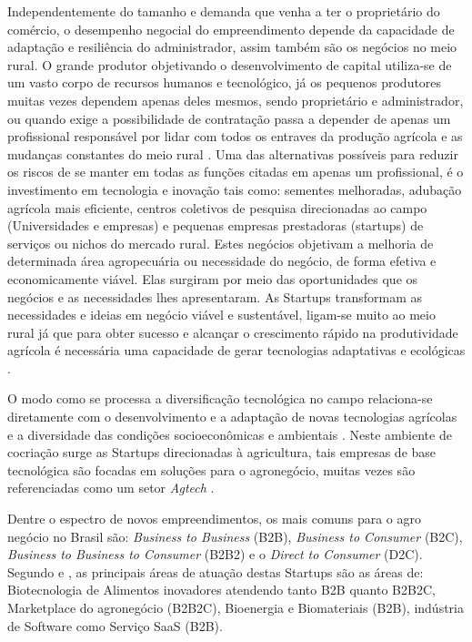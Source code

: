 Independentemente do tamanho e demanda que venha a ter o proprietário do comércio, o desempenho negocial do empreendimento depende da capacidade de adaptação e resiliência  do administrador, assim também são os negócios no meio rural. O grande produtor objetivando o desenvolvimento de capital utiliza-se de um vasto corpo de recursos humanos e tecnológico, já os pequenos produtores muitas vezes dependem apenas deles mesmos, sendo proprietário e administrador, ou quando exige a possibilidade de contratação passa a depender de apenas um profissional responsável por lidar com todos os entraves da produção agrícola e as mudanças constantes do meio rural \cite{soares_relacao_2017}. Uma das alternativas possíveis para reduzir os riscos de se manter em todas as funções citadas em apenas um profissional, é o investimento em tecnologia e inovação tais como: sementes melhoradas, adubação agrícola mais eficiente, centros coletivos de pesquisa direcionadas ao campo (Universidades e empresas) \cite{bochi_dorneles_coletivos_2014, gomes_inovacao_2014} e pequenas empresas prestadoras (startups) de serviços ou nichos do mercado rural. Estes negócios objetivam a melhoria de determinada área agropecuária \cite{junior_agtechs:_2019} ou necessidade do negócio, de forma efetiva e economicamente viável. Elas surgiram por meio das oportunidades que os negócios e as necessidades lhes apresentaram. As Startups transformam as necessidades e ideias em negócio viável e sustentável, ligam-se muito ao meio rural já que para obter sucesso e alcançar o crescimento rápido na produtividade agrícola é necessária uma capacidade de gerar tecnologias adaptativas e ecológicas \cite{contini_hayami_2019}.

O modo como se processa a diversificação tecnológica no campo relaciona-se diretamente com o desenvolvimento e a adaptação de novas tecnologias agrícolas e a diversidade das condições socioeconômicas e ambientais \cite{fen-azmeyer_o_2019}. Neste ambiente de cocriação surge as Startups direcionadas à agricultura, tais empresas de base tecnológica são focadas em soluções para o agronegócio, muitas vezes são referenciadas como um setor \textit{Agtech} \cite{blanco_agtechs:_2019}.

Dentre o espectro de novos empreendimentos, os mais comuns para o agro negócio no Brasil são: \textit{Business to Business} (B2B), \textit{Business to Consumer} (B2C), \textit{Business to Business to Consumer} (B2B2) e o \textit{Direct to Consumer} (D2C). Segundo  e \cite{abstartups_startupbase_2019}, as principais  áreas de atuação destas Startups são as áreas de: Biotecnologia de Alimentos inovadores atendendo tanto B2B quanto B2B2C, Marketplace do agronegócio (B2B2C), Bioenergia e Biomateriais (B2B), indústria de Software como Serviço SaaS (B2B).


